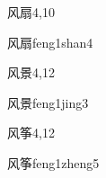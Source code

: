 \begin{entry}{风扇}{4,10}
  \begin{phonetics}{风扇}{feng1shan4}
  \end{phonetics}
\end{entry}

\begin{entry}{风景}{4,12}
  \begin{phonetics}{风景}{feng1jing3}
  \end{phonetics}
\end{entry}

\begin{entry}{风筝}{4,12}
  \begin{phonetics}{风筝}{feng1zheng5}
  \end{phonetics}
\end{entry}


